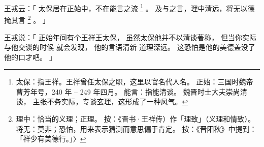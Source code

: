 
\switchcolumn*[\section{}]

王戎云：「
    太保居在正始中，不在能言之流%
    \footnote{%
        太保：指王祥。王祥曾任太保之职，这里以官名代人名。
        正始：三国时魏帝曹芳年号，240 年 -- 249 年四月。
        能言：指能清谈。
              魏晋时士大夫崇尚清谈，
              主张不务实际，专谈玄理，这形成了一种风气。
    }%
    。
    及与之言，理中清远，将无以德掩其言%
    \footnote{%
        理中：恰当的义理；正理。
        按：《晋书·王祥传）作「理致」（义理和情致）。
        将无：莫非；恐怕，用来表示猜测而意思偏于肯定。
        按：《晋阳秋》中提到：「祥少有美德行。」〉
    }%
    。
」

\switchcolumn

王戎说：「
    正始年间有个王祥王太保，
    虽然太保他并不以清谈著称，
    但当你实际与他交谈的时候
    就会发现，
    他的言语清新
        道理深远。
    这恐怕是他的美德盖没了他的口才吧。
」
